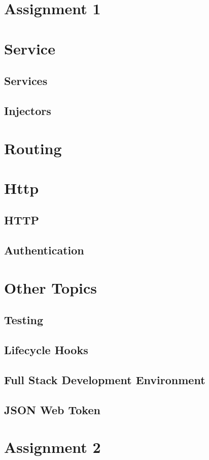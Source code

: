 \documentclass[a4paper]{article}
\begin{document}
\section{Assignment 1}

\section{Service}
\subsection{Services}
\subsection{Injectors}

\section{Routing}

\section{Http}
\subsection{HTTP}
\subsection{Authentication}

\section{Other Topics}
\subsection{Testing}
\subsection{Lifecycle Hooks}
\subsection{Full Stack Development Environment}
\subsection{JSON Web Token}

\section{Assignment 2}
\end{document}
